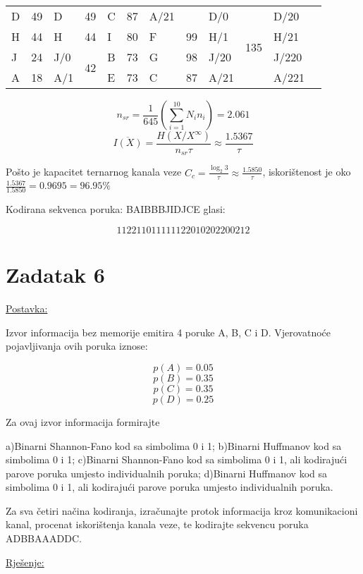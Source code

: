\documentclass[12pt]{article}
\begin{document}
\begin{table}[hp]
\begin{tabular}{|l|l|l|l|l|l|l|l|l|l|l|l|}
D             & 49            & D       & 49                     & C       & 87                     & A/21    &                        & D/0     & \multirow{4}{*}{135}   & D/20    &                        \\ \cline{1-8}
H             & 44            & H       & 44                     & I       & 80                     & F       & 99                     & H/1     &                        & H/21    &                        \\ \cline{1-8}
J             & 24            & J/0     & \multirow{2}{*}{42}    & B       & 73                     & G       & 98                     & J/20    &                        & J/220   &                        \\ \cline{1-2} \cline{5-8}
A             & 18            & A/1     &                        & E       & 73                     & C       & 87                     & A/21    &                        & A/221   &                        \\ \hline
\end{tabular}
\end{table}

$$n_{sr} = \frac{1}{645} (\sum_{i = 1}^{10} N_i n_i) = 2.061$$
$$\overline{I(X)} = \frac{H(X/X^{\infty}) }{n_{sr} \tau} \approx \frac{1.5367}{\tau}$$

Pošto je kapacitet ternarnog kanala veze $C_c = \frac{\log_{2}3}{\tau} \approx \frac{1.5850}{\tau}$, iskorištenost je oko $\frac{1.5367}{1.5850} = 0.9695 = 96.95\%$

Kodirana sekvenca poruka: BAIBBBJIDJCE glasi:

$$112211011111122010202200212$$


\newpage

\section*{Zadatak 6\label{Z6}}

\underline{Postavka:}

Izvor informacija bez memorije emitira 4 poruke A, B, C i D. Vjerovatnoće pojavljivanja ovih poruka iznose:

$$p(A) = 0.05$$
$$p(B) = 0.35$$
$$p(C) = 0.35$$
$$p(D) = 0.25$$

Za ovaj izvor informacija formirajte

a)Binarni Shannon-Fano kod sa simbolima 0 i 1;
b)Binarni Huffmanov kod sa simbolima 0 i 1;
c)Binarni Shannon-Fano kod sa simbolima 0 i 1, ali kodirajući parove poruka umjesto individualnih poruka;
d)Binarni Huffmanov kod sa simbolima 0 i 1, ali kodirajući parove poruka umjesto individualnih poruka.

Za sva četiri načina kodiranja, izračunajte protok informacija kroz komunikacioni kanal, procenat iskorištenja kanala veze, te kodirajte sekvencu poruka ADBBAAADDC.

\underline{Rješenje:}\\
\end{document}
